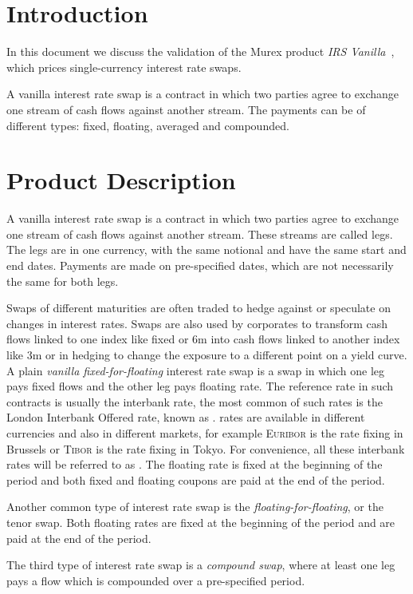 \documentclass[]{pmv_report} %
\begin{document}
\section{Introduction}
In this document we discuss the validation of the Murex product \textit{IRS Vanilla}~\cite{Mx.VanillaSwaps}, which prices single-currency interest rate swaps.

A vanilla interest rate swap is a contract in which two parties agree to exchange one stream of cash flows against another stream.
The payments can be of different types: fixed, floating, averaged and compounded.

\section{Product Description}
A vanilla interest rate swap is a contract in which two parties agree to exchange one stream of cash flows against another stream.
These streams are called legs.
The legs are in one currency, with the same notional and have the same start and end dates.
Payments are made on pre-specified dates, which are not necessarily the same for both legs.

Swaps of different maturities are often traded to hedge against or speculate on changes in interest rates.
Swaps are also used by corporates to transform cash flows linked to one index like fixed or 6m \Libor into cash flows linked to another index like 3m \Libor or in hedging to change the exposure to a different point on a yield curve.
A plain \textit{vanilla fixed-for-floating} interest rate swap is a swap in which one leg pays fixed flows and the other leg pays floating rate.
The reference rate in such contracts is usually the interbank rate, the most common of such rates is the London Interbank Offered rate, known as \Libor.
\Libor rates are available in different currencies and also in different markets, for example \textsc{Euribor} is the rate fixing in Brussels or \textsc{Tibor} is the rate fixing in Tokyo.
For convenience, all these interbank rates will be referred to as \Libor.
The floating rate is fixed at the beginning of the period and both fixed and floating coupons are paid at the end of the period.

Another common type of interest rate swap is the \textit{floating-for-floating}, or the tenor swap.
Both floating rates are fixed at the beginning of the period and are paid at the end of the period.

The third type of interest rate swap is a \textit{compound swap}, where at least one leg pays a flow which is compounded over a pre-specified period.
\end{document}
